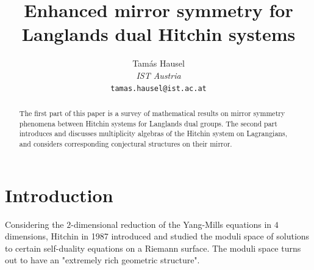 \documentclass[12pt]{article}
\numberwithin{equation}{section}
\theoremstyle{remark}
\numberwithin{theorem}{section}
\numberwithin{equation}{section}
\begin{document}




\title{Enhanced mirror symmetry for Langlands dual Hitchin systems}

\author{ Tam\'as Hausel
	\\ {\it IST Austria} 
	\\{\tt tamas.hausel@ist.ac.at}} 
	
\maketitle


\begin{abstract}
The first part of this paper is a survey of mathematical results on mirror symmetry phenomena between Hitchin systems for Langlands dual groups. The second part introduces and discusses multiplicity algebras of the Hitchin system on Lagrangians, and considers corresponding conjectural structures on their mirror.  
\end{abstract}




 \section{Introduction} Considering the $2$-dimensional reduction of the Yang-Mills equations in $4$ dimensions, Hitchin  \cite{hitchin} in 1987 introduced and studied the moduli space of solutions to certain self-duality equations on a Riemann surface. The moduli space turns out to have an "extremely rich geometric structure". 
\end{document}
